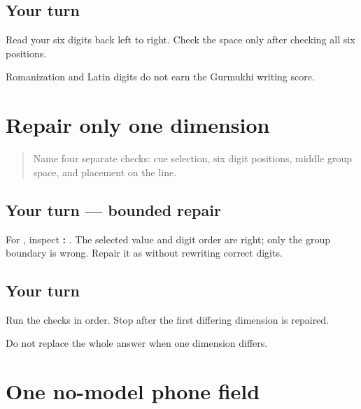 \subsection*{Your turn}
Read your six digits back left to right. Check the space only after checking all six positions.

\begin{tcolorbox}[breakable,colback=teal!4,colframe=teal!35!black,title={Before you move on}]
Romanization and Latin digits do not earn the Gurmukhi writing score.
\end{tcolorbox}
\section[select · digits … (four repair passes)]{Repair only one dimension}

\label{lesson:PA-W08-phone-repair}



\begin{quote}
Name four separate checks: cue selection, six digit positions, middle group space, and placement on the \textbf{} line.
\end{quote}

\subsection*{Your turn — bounded repair}
For \textbf{}, inspect \textbf{:  }. The selected value and digit order are right; only the group boundary is wrong. Repair it as \textbf{ } without rewriting correct digits.

\subsection*{Your turn}
Run the checks in order. Stop after the first differing dimension is repaired.

\begin{tcolorbox}[breakable,colback=teal!4,colframe=teal!35!black,title={Before you move on}]
Do not replace the whole answer when one dimension differs.
\end{tcolorbox}
\section[\texorpdfstring{\pa{ਫ਼ੋਨ}: \_\_\_\_\_\_\_\_\_\_ (phone field)}{ਫ਼ੋਨ: \_\_\_\_\_\_\_\_\_\_ (phone field)}]{One no-model phone field}

